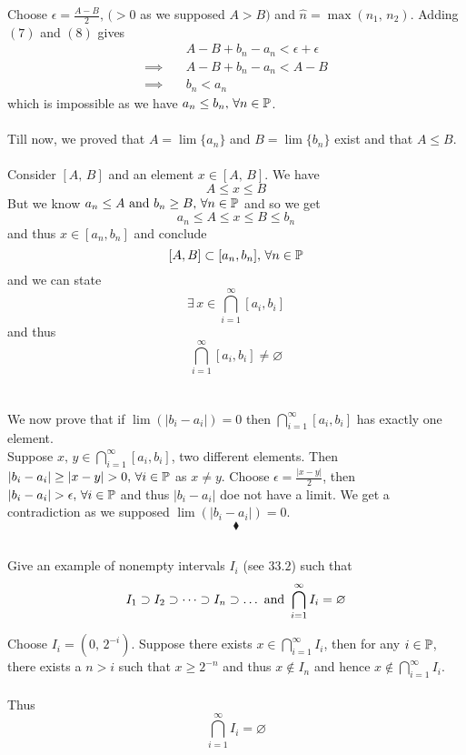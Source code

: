Choose $\epsilon = \frac{A-B}{2},\, (>0$ as we supposed $A>B)$ and  $\hat{n}=\max(n_1,\, n_2)$. Adding $(7)$ and $(8)$ gives
\begin{align}
&A-B+ b_n-a_n<\epsilon+\epsilon\\
\implies\quad &A-B+ b_n-a_n <A-B\\
\implies\quad & b_n <a_n
\end{align}
which is impossible as we have $a_n \leq b_n,\, \forall n\in \mathbb{P}$.\\\\
Till now, we proved that $A=\lim \{a_n\} $ and $B=\lim \{b_n\}$ exist and that $A\leq B$.\\\\
Consider $[A,\, B]$ and an element $x\in [A,\, B]$. We have 
$$A\leq x\leq B$$
But we know $a_n\leq A\text{ and } b_n\geq B,\, \forall n\in \mathbb{P}$ and so we get  
$$a_n\leq A\leq x\leq B\leq b_n$$
and thus $x\in [a_n,b_n]$ and conclude 
$$[A,B]\subset [a_n,b_n],\,  \forall n \in \mathbb{P}$$ and we can state
$$\exists\, x\in  \bigcap^{\infty}_{i=1}[a_i,b_i]$$ and thus
$$\bigcap^{\infty}_{i=1}[a_i,b_i]\neq \varnothing$$
\\\\
We now prove that if $\lim \left(|b_i -a_i|\right)=0$ then $\bigcap^{\infty}_{i=1}[a_i,b_i]$ has exactly one element.\\
Suppose $x,\, y\in \bigcap^{\infty}_{i=1}[a_i,b_i]$, two different elements. Then $| b_i-a_i| \geq |x-y| >0,\, \forall i\in \mathbb{P}$ as $x\neq y$. Choose $\epsilon=\frac{|x-y|}{2}$, then 
$| b_i-a_i|  >\epsilon ,\, \forall i\in \mathbb{P}$ and thus $|b_i-a_i|$ doe not have a limit. We get a contradiction as we supposed $\lim \left(|b_i -a_i|\right)=0$.
$$\blacklozenge$$
\newpage
\subsection{}
\begin{tcolorbox}
Give an example of nonempty intervals $I_i$ (see $\mathbf{33.2}$) such that 
$$I_1\supset I_2 \supset \dots \supset I_n\supset \dots  \text{ and } \bigcap^{\infty}_{i=1}I_i=\varnothing $$
\end{tcolorbox}
Choose $I_i=(0,\, 2^{-i})$. Suppose there exists $x\in \bigcap^{\infty}_{i=1}I_i$, then for any $i\in \mathbb{P}$, there exists a $n > i$ such that $x\geq 2^{-n}$ and thus $x\not\in I_n$ and hence $x\not\in \bigcap^{\infty}_{i=1}I_i$.\\\\
Thus $$\bigcap^{\infty}_{i=1}I_i=\varnothing $$

